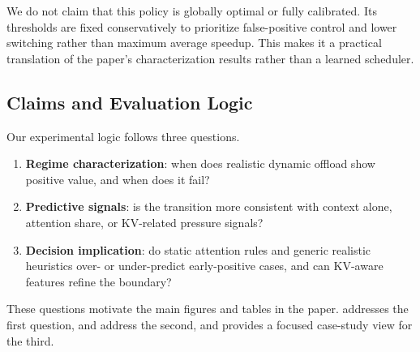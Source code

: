 We do not claim that this policy is globally optimal or fully calibrated. Its thresholds are fixed conservatively to prioritize false-positive control and lower switching rather than maximum average speedup. This makes it a practical translation of the paper's characterization results rather than a learned scheduler.

\subsection{Claims and Evaluation Logic}

Our experimental logic follows three questions.
\begin{enumerate}
\item \textbf{Regime characterization}: when does realistic dynamic offload show positive value, and when does it fail?
\item \textbf{Predictive signals}: is the transition more consistent with context alone, attention share, or KV-related pressure signals?
\item \textbf{Decision implication}: do static attention rules and generic realistic heuristics over- or under-predict early-positive cases, and can KV-aware features refine the boundary?
\end{enumerate}

These questions motivate the main figures and tables in the paper.  addresses the first question,  and  address the second, and  provides a focused case-study view for the third.
